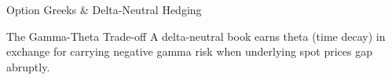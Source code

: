\begin{frame}{Option Greeks \& Delta-Neutral Hedging}
  \vspace{.15cm}
  \begin{ConceptCard}{The Gamma-Theta Trade-off}
    A delta-neutral book earns theta (time decay) in exchange for carrying negative gamma risk when underlying spot prices gap abruptly.
  \end{ConceptCard}
\end{frame}
